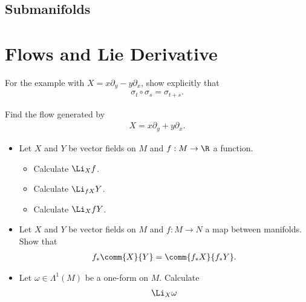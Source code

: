 \subsection{Submanifolds}

\section{Flows and Lie Derivative}

\begin{Ebox}
  For the example with $X=x\partial_y -y\partial_x$, show explicitly that 
  \begin{align}
    \sigma_t\circ \sigma_s = \sigma_{t+s}.
  \end{align}
\end{Ebox}


\begin{Ebox}
  Find the flow generated by
  \begin{align}
    X = x\partial_y +y\partial_x.
  \end{align}
\end{Ebox}

\begin{Ebox}
  \begin{itemize}
  \item Let $X$ and $Y$ be vector fields on $M$ and $f:M\to\R$ a function.
    \begin{itemize}
    \item Calculate $\Li_{X}f$.
    \item Calculate $\Li_{fX}Y$.
    \item Calculate $\Li_{X}fY$.
    \end{itemize}
  \item  Let $X$ and $Y$ be vector fields on $M$ and $f:M\to N$ a map between manifolds. Show that
    \begin{align}
      f_*\comm{X}{Y} =\comm{f_*X}{f_*Y}.
    \end{align}
  \item Let $\omega\in\Lambda^1(M)$ be a one-form on $M$. Calculate
    \begin{align}
      \Li_X \omega
    \end{align}
  \end{itemize}
\end{Ebox}
